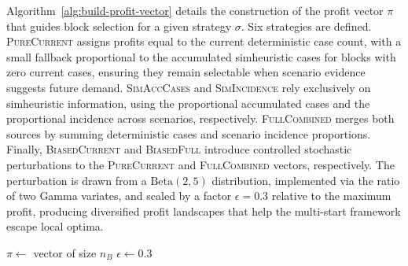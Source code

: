 Algorithm~\ref{alg:build-profit-vector} details the construction of the profit vector
$\pi$ that guides block selection for a given strategy $\sigma$. Six strategies are
defined. \textsc{PureCurrent} assigns profits equal to the current deterministic case
count, with a small fallback proportional to the accumulated simheuristic cases for
blocks with zero current cases, ensuring they remain selectable when scenario evidence
suggests future demand. \textsc{SimAccCases} and \textsc{SimIncidence} rely exclusively
on simheuristic information, using the proportional accumulated cases and the proportional
incidence across scenarios, respectively. \textsc{FullCombined} merges both sources by
summing deterministic cases and scenario incidence proportions. Finally,
\textsc{BiasedCurrent} and \textsc{BiasedFull} introduce controlled stochastic
perturbations to the \textsc{PureCurrent} and \textsc{FullCombined} vectors,
respectively. The perturbation is drawn from a $\mathrm{Beta}(2,5)$ distribution,
implemented via the ratio of two Gamma variates, and scaled by a factor
$\epsilon = 0.3$ relative to the maximum profit, producing diversified profit landscapes
that help the multi-start framework escape local optima.

\begin{algorithm}[h!]
	\caption{Build Profit Vector} \label{alg:build-profit-vector}
	\SetAlgoLined

	$\pi \leftarrow$ vector of size $n_B$\;
	$\epsilon \leftarrow 0.3$ 


	\Return{$\pi$}\;
\end{algorithm}

